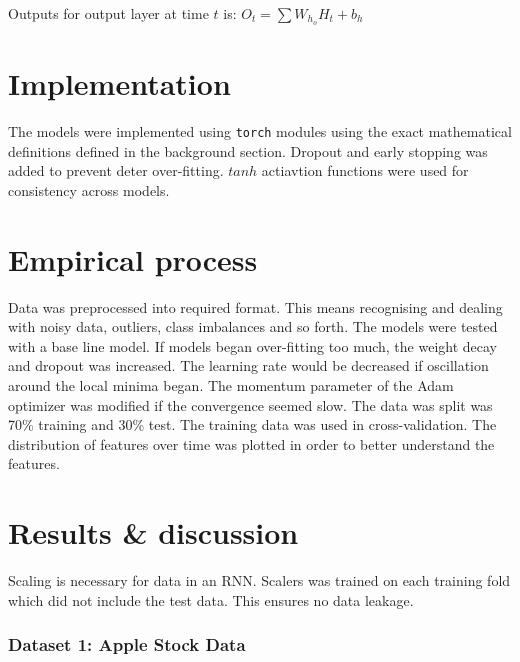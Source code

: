 \documentclass[conference]{IEEEtran}
\begin{document}
Outputs for output layer at time $t$ is: $O_{t} = \sum W_{h_o} H_{t} + b_{h}$








\section{Implementation}

The models were implemented using \texttt{torch} modules using the exact mathematical definitions defined in the background section. Dropout and early stopping was added to prevent deter over-fitting. $tanh$ actiavtion functions were used for consistency across models.



\section{Empirical process}

Data was preprocessed into required format. This means recognising and dealing with noisy data, outliers, class imbalances and so forth. The models were tested with a base line model. If models began over-fitting too much, the weight decay and dropout was increased. The learning rate would be decreased if oscillation around the local minima began. The momentum parameter of the Adam optimizer was modified if the convergence seemed slow. The data was split was 70\% training and 30\% test. The training data was used in cross-validation. The distribution of features over time was plotted in order to better understand the features.

\section{Results \& discussion}

Scaling is necessary for data in an RNN. Scalers was trained on each training fold which did not include the test data. This ensures no data leakage.

\subsubsection{Dataset 1: Apple Stock Data}
\end{document}
